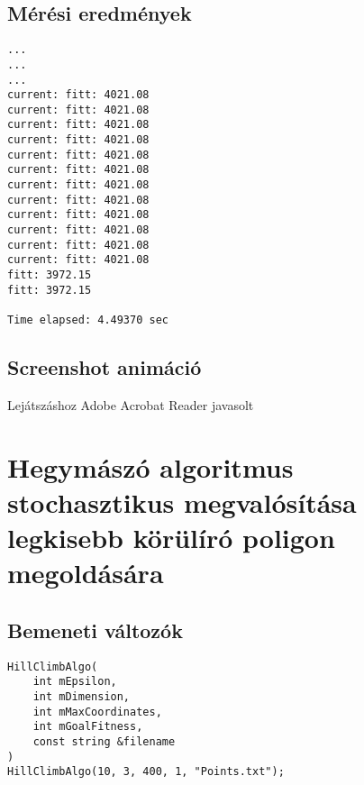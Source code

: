\documentclass[12pt,a4paper,oneside]{report}
\begin{document}
\section*{Mérési eredmények}
\begin{lstlisting}
...
...
...
current: fitt: 4021.08
current: fitt: 4021.08
current: fitt: 4021.08
current: fitt: 4021.08
current: fitt: 4021.08
current: fitt: 4021.08
current: fitt: 4021.08
current: fitt: 4021.08
current: fitt: 4021.08
current: fitt: 4021.08
current: fitt: 4021.08
current: fitt: 4021.08
fitt: 3972.15
fitt: 3972.15

Time elapsed: 4.49370 sec

\end{lstlisting}

\section*{Screenshot animáció}
Lejátszáshoz Adobe Acrobat Reader javasolt\newline
{}





\chapter*{Hegymászó algoritmus stochasztikus megvalósítása legkisebb körülíró poligon megoldására}
\section*{Bemeneti változók}

\begin{lstlisting}
HillClimbAlgo(
	int mEpsilon, 
	int mDimension,
	int mMaxCoordinates, 
	int mGoalFitness, 
	const string &filename
)
HillClimbAlgo(10, 3, 400, 1, "Points.txt");
\end{lstlisting}
\end{document}
